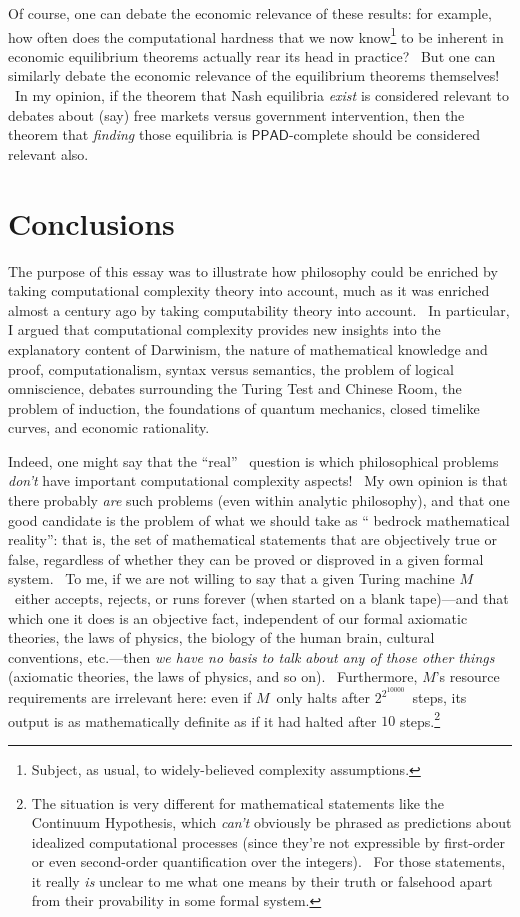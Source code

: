 \documentclass[12pt,onecolumn]{article}%
\begin{document}
Of course, one can debate the economic relevance of these results: for
example, how often does the computational hardness that we now
know\footnote{Subject, as usual, to widely-believed complexity assumptions.}
to be inherent in economic equilibrium theorems actually rear its head in
practice? \ But one can similarly debate the economic relevance of the
equilibrium theorems themselves! \ In my opinion, if the theorem that Nash
equilibria \textit{exist} is considered relevant to debates about (say) free
markets versus government intervention, then the theorem that \textit{finding}
those equilibria is $\mathsf{PPAD}$-complete should be considered relevant also.

\section{Conclusions\label{CONC}}

The purpose of this essay was to illustrate how philosophy could be enriched
by taking computational complexity theory into account, much as it was
enriched almost a century ago by taking computability theory into account.
\ In particular, I argued that computational complexity provides new insights
into the explanatory content of Darwinism, the nature of mathematical
knowledge and proof, computationalism, syntax versus semantics, the problem of
logical omniscience, debates surrounding the Turing Test and Chinese Room, the
problem of induction, the foundations of quantum mechanics, closed timelike
curves, and economic rationality.

Indeed, one might say that the \textquotedblleft real\textquotedblright%
\ question is which philosophical problems \textit{don't} have important
computational complexity aspects! \ My own opinion is that there probably
\textit{are} such problems (even within analytic philosophy), and that one
good candidate is the problem of what we should take as \textquotedblleft
bedrock mathematical reality\textquotedblright: that is, the set of
mathematical statements that are objectively true or false, regardless of
whether they can be proved or disproved in a given formal system. \ To me, if
we are not willing to say that a given Turing machine $M$\ either accepts,
rejects, or runs forever (when started on a blank tape)---and that which one
it does is an objective fact, independent of our formal axiomatic theories,
the laws of physics, the biology of the human brain, cultural conventions,
etc.---then \textit{we have no basis to talk about any of those other things}
(axiomatic theories, the laws of physics, and so on). \ Furthermore, $M$'s
resource requirements are irrelevant here: even if $M$\ only halts after
$2^{2^{10000}}$\ steps, its output is as mathematically definite as if it had
halted after $10$ steps.\footnote{The situation is very different for
mathematical statements like the Continuum Hypothesis, which \textit{can't}
obviously be phrased as predictions about idealized computational processes
(since they're not expressible by first-order or even second-order
quantification over the integers). \ For those statements, it really
\textit{is} unclear to me what one means by their truth or falsehood apart
from their provability in some formal system.}
\end{document}
